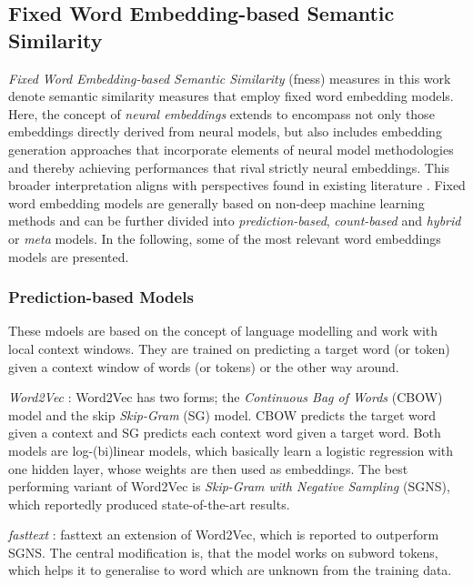 \documentclass[11pt]{scrreprt}
\let\cite\parencite  %
\begin{document}
\subsection{Fixed Word Embedding-based Semantic Similarity}
\label{sec:fixed-word-embedding-semantic-similairity}
\textit{Fixed Word Embedding-based Semantic Similarity} (\gls{fness}) measures in this work denote semantic similarity measures that employ fixed word embedding models. Here, the concept of \textit{neural embeddings} extends to encompass not only those embeddings directly derived from neural models, but also includes embedding generation approaches that incorporate elements of neural model methodologies and thereby achieving performances that rival strictly neural embeddings. This broader interpretation aligns with perspectives found in existing literature \cite{zucconIntegratingEvaluatingNeural2015, sezererSurveyNeuralWord2021}. Fixed word embedding models are generally based on non-deep machine learning methods and can be further divided into \textit{prediction-based}, \textit{count-based} and \textit{hybrid} or \textit{meta} models. In the following, some of the most relevant word embeddings models are presented. 

\subsubsection{Prediction-based Models} 
These mdoels are based on the concept of language modelling and work with local context windows. They are trained on predicting a target word (or token) given a context window of words (or tokens) or the other way around.

\textit{Word2Vec} \cite{mikolovDistributedRepresentationsWords2013, mikolovLinguisticRegularitiesContinuous2013, mikolovEfficientEstimationWord2013}: Word2Vec has two forms; the \textit{Continuous Bag of Words} (CBOW) model and the skip \textit{Skip-Gram} (SG) model. CBOW predicts the target word given a context and SG predicts each context word given a target word. Both models are log-(bi)linear models, which basically learn a logistic regression with one hidden layer, whose weights are then used as embeddings. The best performing variant of Word2Vec is \textit{Skip-Gram with Negative Sampling} (SGNS), which reportedly produced state-of-the-art results.

\textit{fasttext} \cite{bojanowskiEnrichingWordVectors2017}: fasttext an extension of Word2Vec, which is reported to outperform SGNS. The central modification is, that the model works on subword tokens, which helps it to generalise to word which are unknown from the training data.
\end{document}
